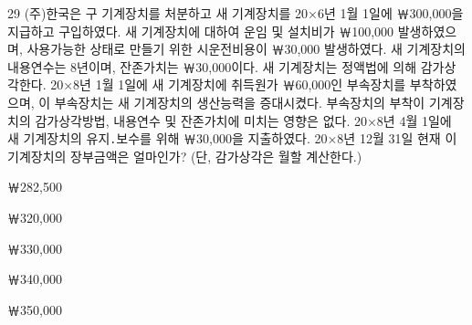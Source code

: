 \begin{question}{29}
(주)한국은 구 기계장치를 처분하고 새 기계장치를 20×6년 1월 1일에 ￦300,000을 지급하고 구입하였다. 새 기계장치에 대하여 운임 및 설치비가 ￦100,000 발생하였으며, 사용가능한 상태로 만들기 위한 시운전비용이 ￦30,000 발생하였다. 새 기계장치의 내용연수는 8년이며, 잔존가치는 ￦30,000이다. 새 기계장치는 정액법에 의해 감가상각한다. 20×8년 1월 1일에 새 기계장치에 취득원가 ￦60,000인 부속장치를 부착하였으며, 이 부속장치는 새 기계장치의 생산능력을 증대시켰다. 부속장치의 부착이 기계장치의 감가상각방법, 내용연수 및 잔존가치에 미치는 영향은 없다. 20×8년 4월 1일에 새 기계장치의 유지․보수를 위해 ￦30,000을 지출하였다. 20×8년 12월 31일 현재 이 기계장치의 장부금액은 얼마인가? (단, 감가상각은 월할 계산한다.)
\begin{choices}
  \item ￦282,500
  \item ￦320,000
  \item ￦330,000
  \item ￦340,000
  \item ￦350,000
\end{choices}
\end{question}
